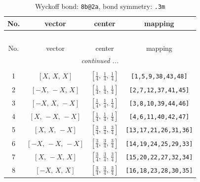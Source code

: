 \documentclass[fleqn,8pt]{jsarticle}
\begin{document}
\begin{longtable}{cccc}
\caption{Wyckoff bond: {\tt 8b@2a}, bond symmetry: {\tt .3m}}
 \\
 \hline \hline
No. & vector & center & mapping \\ \hline \endfirsthead

\multicolumn{3}{l}{\tablename\ \thetable{}} \\
 \hline \hline
No. & vector & center & mapping \\ \hline \endhead

 \hline \hline
\multicolumn{3}{r}{\footnotesize\it continued ...} \\ \endfoot

 \hline \hline
\multicolumn{3}{r}{} \\ \endlastfoot

1 & $\left[ X,\, X,\, X \right]$ & $\left[ \frac{1}{4},\, \frac{1}{4},\, \frac{1}{4} \right]$ & {\tt [1,5,9,38,43,48]} \\ \hline
2 & $\left[ - X,\, - X,\, X \right]$ & $\left[ \frac{1}{4},\, \frac{1}{4},\, \frac{1}{4} \right]$ & {\tt [2,7,12,37,41,45]} \\ \hline
3 & $\left[ - X,\, X,\, - X \right]$ & $\left[ \frac{1}{4},\, \frac{1}{4},\, \frac{1}{4} \right]$ & {\tt [3,8,10,39,44,46]} \\ \hline
4 & $\left[ X,\, - X,\, - X \right]$ & $\left[ \frac{1}{4},\, \frac{1}{4},\, \frac{1}{4} \right]$ & {\tt [4,6,11,40,42,47]} \\ \hline
5 & $\left[ X,\, X,\, - X \right]$ & $\left[ \frac{3}{4},\, \frac{3}{4},\, \frac{3}{4} \right]$ & {\tt [13,17,21,26,31,36]} \\ \hline
6 & $\left[ - X,\, - X,\, - X \right]$ & $\left[ \frac{3}{4},\, \frac{3}{4},\, \frac{3}{4} \right]$ & {\tt [14,19,24,25,29,33]} \\ \hline
7 & $\left[ X,\, - X,\, X \right]$ & $\left[ \frac{3}{4},\, \frac{3}{4},\, \frac{3}{4} \right]$ & {\tt [15,20,22,27,32,34]} \\ \hline
8 & $\left[ - X,\, X,\, X \right]$ & $\left[ \frac{3}{4},\, \frac{3}{4},\, \frac{3}{4} \right]$ & {\tt [16,18,23,28,30,35]} \\
\end{longtable}
\renewcommand{\arraystretch}{1.2}
\end{document}
